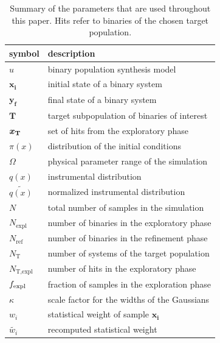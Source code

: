 \documentclass[a4paper,fleqn,usenatbib,useAMS,usedcolumn]{mnras}
\begin{document}
%
\begin{table}
\centering
\begin{tabular}{|l|l|} \hline %
\textbf{symbol} & \textbf{description}    \\ \hline 
$u$ & {binary population synthesis model} \\ \hline
$\boldsymbol{x_i}$ & {initial state of a binary system} \\ \hline
$\boldsymbol{y_f}$ & {final state of a binary system} \\ \hline
$\boldsymbol{T}$ & {target subpopulation of binaries of interest} \\ \hline
$\boldsymbol{{x_{\rm{T}}}}$ & {set of hits from the exploratory phase} \\ \hline
$\pi(x)$ & {distribution of the initial conditions} \\ \hline
 ${\Omega}$ & {physical parameter range of the simulation} \\ \hline
$q(x)$ & {instrumental distribution } \\ \hline
$\widetilde{q(x)}$ & {normalized instrumental distribution } \\ \hline
$N$ & {total number of samples in the simulation} \\ \hline
$N_{\text{expl}}$ & {number of binaries in the exploratory phase} \\ \hline
$N_{\text{ref}}$ & {number of binaries in the refinement phase} \\ \hline
$N_{\text{T}}$ & {number of systems of the target population} \\ \hline
$N_{\text{T,expl}}$ & {number of hits in the exploratory phase} \\ \hline
$f_{\rm{expl}}$ & {fraction of samples in the exploration phase} \\ \hline
$\kappa$ & {scale factor for the widths of the Gaussians} \\ \hline
$w_i$ & {statistical weight of sample $\boldsymbol{x_i}$} \\ \hline
$\widetilde{w_i}$ & {recomputed statistical weight} \\ \hline  %
\end{tabular}
\caption{Summary of the parameters that are used throughout this paper. Hits refer to binaries of the chosen target population.} 
\label{tab:variables}
\end{table}
%
\end{document}
